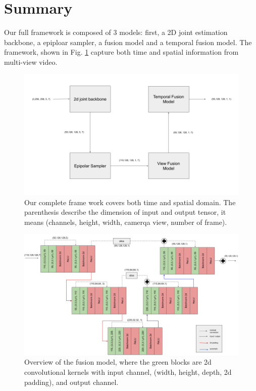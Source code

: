 \section{Summary}
Our full framework is composed of 3 models: first, a 2D joint estimation backbone, a epiploar sampler, a fusion model and a temporal fusion model. The framework, shown in Fig. \ref{fig:full-framework} capture both time and spatial information from multi-view video.
\begin{figure}
	\centering
	\includegraphics[width=0.7\columnwidth]{figures/ch4/full-model.png}
	\caption{Our complete frame work covers both time and spatial domain. The parenthesis describe the dimension of input and output tensor, it means (channels, height, width, camerqa view, number of frame).}
	\label{fig:full-framework}
\end{figure}
\begin{figure}
	\centering
	\includegraphics[width=1.0\columnwidth]{figures/ch4/temporal-fusion.png}
	\caption{Overview of the fusion model, where the green blocks are 2d convolutional kernels with input channel, (width, height, depth, 2d padding), and output channel.}
	\label{fig:view-baseline}
\end{figure}